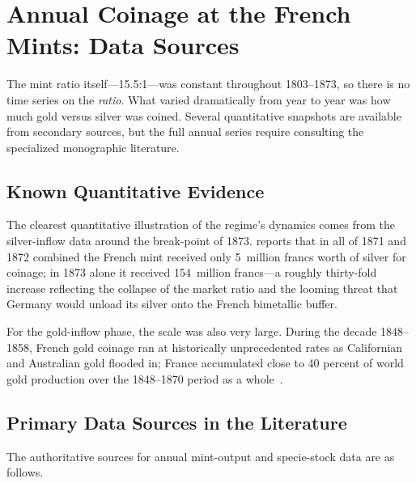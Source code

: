 \documentclass[12pt,letterpaper]{article}
\begin{document}
\section{Annual Coinage at the French Mints: Data Sources}

The mint ratio itself---15.5:1---was constant throughout 1803--1873, so there is no
time series on the \emph{ratio}.  What varied dramatically from year to year was how
much gold versus silver was coined.  Several quantitative snapshots are available
from secondary sources, but the full annual series require consulting the
specialized monographic literature.

\subsection{Known Quantitative Evidence}

The clearest quantitative illustration of the regime's dynamics comes from the
silver-inflow data around the break-point of 1873.  \citet{wikipedia_lmu} reports
that in all of 1871 and 1872 combined the French mint received only 5~million francs
worth of silver for coinage; in 1873 alone it received 154~million francs---a
roughly thirty-fold increase reflecting the collapse of the market ratio and the
looming threat that Germany would unload its silver onto the French bimetallic
buffer.

For the gold-inflow phase, the scale was also very large.  During the decade
1848--1858, French gold coinage ran at historically unprecedented rates as Californian
and Australian gold flooded in; France accumulated close to 40 percent of world gold
production over the 1848--1870 period as a whole~\citep{wikipedia_bimetallism}.

\subsection{Primary Data Sources in the Literature}

The authoritative sources for annual mint-output and specie-stock data are as
follows.
\end{document}
